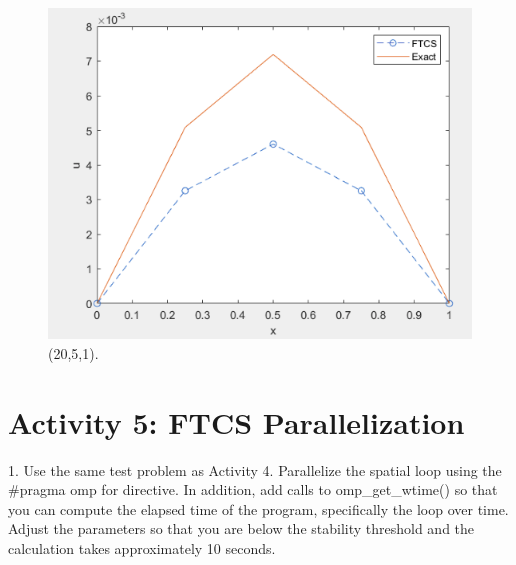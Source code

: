 \documentclass[letterpaper, 10 pt, conference]{ieeeconf}
\begin{document}
\begin{figure}[htbp]
\centering
\includegraphics[width=0.97\columnwidth]{Figuras/mat5.png}
\caption{(20,5,1).}
\label{stability}
\end{figure}


\section{Activity 5: FTCS Parallelization }
1. Use the same test problem as Activity 4. Parallelize the spatial loop using the #pragma omp for directive. In addition, 
add calls to omp\_get\_wtime() so that you can compute the elapsed time of the program, specifically the loop over time. 
Adjust the parameters so that you are below the stability threshold and the calculation takes approximately 10 seconds. 
\end{document}
